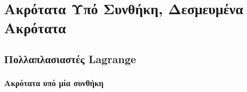 






\chapter{Ακρότατα Υπό Συνθήκη, Δεσμευμένα Ακρότατα}

\section{Πολλαπλασιαστές Lagrange}

\subsection{Ακρότατα υπό μία συνθήκη}

